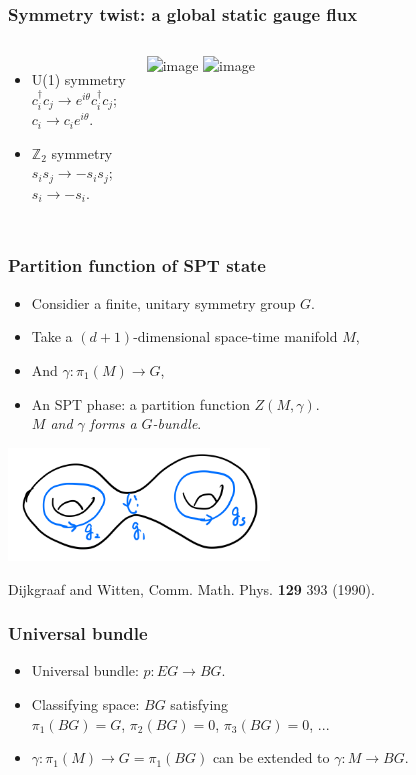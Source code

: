\documentclass[xcolor=table, aspectratio=169,ignorenonframetext]{beamer}
\begin{document}
\begin{frame}
	\frametitle{Symmetry twist: a global static gauge flux}
	\begin{columns}
		\begin{itemize}
			\item U(1) symmetry\\
			$c_i^\dagger c_j\rightarrow e^{i\theta}c_i^\dagger c_j$;\\
			$c_i\rightarrow c_ie^{i\theta}$.
			\item $\mathbb Z_2$ symmetry\\
			$s_is_j\rightarrow-s_is_j$;\\
			$s_i\rightarrow -s_i$.
		\end{itemize}
		\includegraphics<1>{sym-twist}
		\includegraphics<2>{sym-gauge}
	\end{columns}
\end{frame}

\begin{frame}
	\frametitle{Partition function of SPT state}
	\begin{itemize}
		\item Considier a finite, unitary symmetry group $G$.
		\item Take a $(d+1)$-dimensional space-time manifold $M$,
		\item And $\gamma:\pi_1(M)\rightarrow G$,
		\item An SPT phase: a partition function $Z(M,\gamma)$.\\
		\emph{$M$ and $\gamma$ forms a $G$-bundle}.
	\end{itemize}
	\begin{center}
		\includegraphics[height=3cm]{manifold}
	\end{center}
	{\small Dijkgraaf and Witten, Comm. Math. Phys. \textbf{129} 393 (1990).}
\end{frame}

\begin{frame}
	\frametitle{Universal bundle}
	\begin{itemize}
		\item Universal bundle: $p: EG \rightarrow BG$.
		\item Classifying space: $BG$ satisfying\\
		$\pi_1(BG) = G$, $\pi_2(BG)=0$, $\pi_3(BG)=0$, ...
		\item $\gamma:\pi_1(M)\rightarrow G=\pi_1(BG)$ can be extended to $\gamma:M\rightarrow BG$.
	\end{itemize}
\end{frame}
\end{document}
